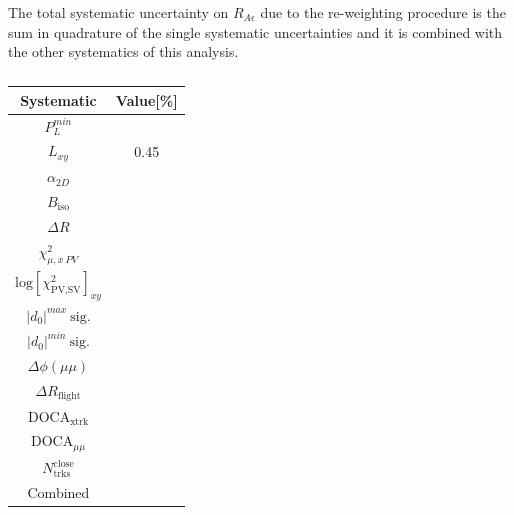 \noindent
The total systematic uncertainty on $R_{A\epsilon}$ due to the re-weighting procedure is the sum in quadrature of the single systematic uncertainties and it is combined with the other systematics of this analysis.

\begin{table}[h]
\centering
\begin{tabular}{|c|c|}
\hline
\textbf{Systematic}                        & \textbf{Value{[}\%{]}} \\ \hline
$P_L^{min}$                                &                        \\
$L_{xy}$                                   & 0.45                   \\
$\alpha_{2D}$                              &                        \\
$B_{\text{iso}}$                           &                        \\
$\Delta R$                                 &                        \\
$\chi^2_{\mu ,x\ PV}$                      &                        \\
$\text{log} [\chi^2_{\text{PV,SV}}]_{xy}$  &                        \\
$|d_0|^{max}\ \text{sig.}$                 &                        \\
$|d_0|^{min}\ \text{sig.}$                 &                        \\
$\Delta \phi(\mu \mu)$                     &                        \\
$\Delta R_{\text{flight}}$                 &                        \\
$\text{DOCA}_{\text{xtrk}}$                &                        \\
$\text{DOCA}_{\mu \mu}$                    &                        \\
$N^{\text{close}}_{\text{trks}}$           &                        \\ \hline
Combined                                   &                        \\ \hline
\end{tabular}
\caption{}
\label{table::BDT syst impact on RAe}
\end{table}

\FloatBarrier

